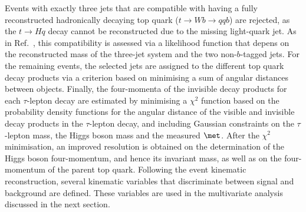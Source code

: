 Events with exactly three jets that are compatible with having a fully reconstructed hadronically decaying 
top quark ($t \to Wb \to qqb$) are rejected, as the $t \to Hq$ decay cannot be reconstructed due to the missing light-quark jet.
As in Ref.~\cite{Chen:2015nta}, this compatibility is assessed via a likelihood function that depens on the reconstructed mass of the three-jet 
system and the two non-$b$-tagged jets.
For the remaining events, the selected jets are assigned to the different top quark decay products via a criterion based on 
minimising a sum of angular distances between objects. Finally, the four-momenta of the invisible decay products for each $\tau$-lepton decay 
are estimated by minimising a $\chi^2$ function based on the probability density functions for the angular distance of the visible and invisible
decay products in the $\tau$-lepton decay, and including Gaussian constraints on the $\tau$-lepton mass, the Higgs boson mass and the
measured $\met$. After the $\chi^2$ minimisation, an improved resolution is obtained on the determination of the Higgs boson four-momentum, and hence
its invariant mass, as well as on the four-momentum of the parent top quark. Following the event kinematic reconstruction, several kinematic variables
that discriminate between signal and background are defined. These variables are used in the multivariate analysis discussed in the next section.

